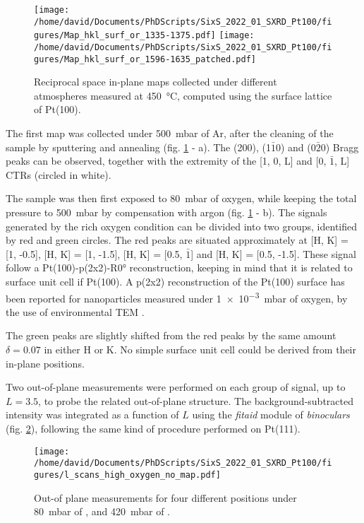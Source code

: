 \begin{figure}[!htb]
    \centering
    \texttt{[image: /home/david/Documents/PhDScripts/SixS\_2022\_01\_SXRD\_Pt100/figures/Map\_hkl\_surf\_or\_1335-1375.pdf]}
    \texttt{[image: /home/david/Documents/PhDScripts/SixS\_2022\_01\_SXRD\_Pt100/figures/Map\_hkl\_surf\_or\_1596-1635\_patched.pdf]}
    \caption{
        Reciprocal space in-plane maps collected under different atmospheres measured at \qty{450}{\degreeCelsius}, computed using the surface lattice of Pt(100).
    }
    \label{fig:MapsPt100A}
\end{figure}

The first map was collected under \qty{500}{\milli\bar} of Ar, after the cleaning of the sample by sputtering and annealing (fig. \ref{fig:MapsPt100A} - a).
The (200), (1$\bar{1}$0) and (0$\bar{2}$0) Bragg peaks can be observed, together with the extremity of the [1, 0, L] and [0, $\bar{1}$, L] CTRs (circled in white).

The sample was then first exposed to \qty{80}{\milli\bar} of oxygen, while keeping the total pressure to \qty{500}{\milli\bar} by compensation with argon (fig. \ref{fig:MapsPt100A} - b).
The signals generated by the rich oxygen condition can be divided into two groups, identified by red and green circles.
The red peaks are situated approximately at [H, K] = [1, -0.5], [H, K] = [1, -1.5], [H, K] = [0.5, $\bar{1}$] and [H, K] = [0.5, -1.5].
These signal follow a Pt(100)-p(2x2)-R\ang{0} reconstruction, keeping in mind that it is related to surface unit cell if Pt(100).
A p(2x2) reconstruction of the Pt(100) surface has been reported for nanoparticles measured under \qty{1e-3}{\milli\bar} of oxygen, by the use of environmental TEM \parencite{Li2016}.

The green peaks are slightly shifted from the red peaks by the same amount $\delta = 0.07$ in either H or K.
No simple surface unit cell could be derived from their in-plane positions.

Two out-of-plane measurements were performed on each group of signal, up to $L=3.5$, to probe the related out-of-plane structure.
The background-subtracted intensity was integrated as a function of $L$ using the \textit{fitaid} module of \textit{binoculars} (fig. \ref{fig:LScansHighOxygenPt100}), following the same kind of procedure performed on Pt(111).

\begin{figure}[!htb]
    \centering
    \texttt{[image: /home/david/Documents/PhDScripts/SixS\_2022\_01\_SXRD\_Pt100/figures/l\_scans\_high\_oxygen\_no\_map.pdf]}
    \caption{
        Out-of plane measurements for four different positions under \qty{80}{\milli\bar} of , and \qty{420}{\milli\bar} of .
    }
    \label{fig:LScansHighOxygenPt100}
\end{figure}

